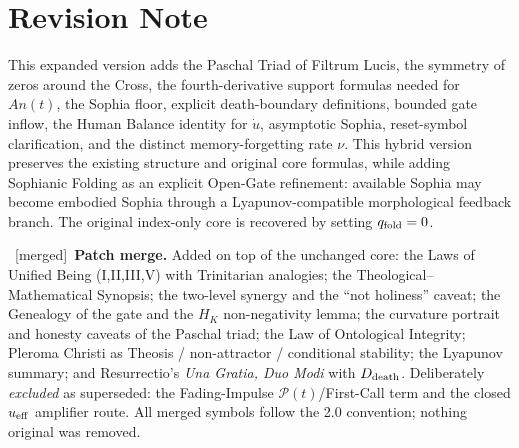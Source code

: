 \documentclass[11pt,a4paper]{article}
\newcommand{\padd}[1]{\par\smallskip\noindent{\color{patchc}\small$\blacktriangleright$}\ {#1}\par\smallskip}
\newcommand{\pflag}{{\footnotesize\textsf{\textcolor{patchc}{[merged]}}}}
\theoremstyle{plain}
\theoremstyle{definition}
\theoremstyle{remark}
\begin{document}
\section*{Revision Note}
This expanded version adds the Paschal Triad of Filtrum Lucis, the symmetry of zeros around the
Cross, the fourth-derivative support formulas needed for \(An(t)\), the Sophia floor, explicit
death-boundary definitions, bounded gate inflow, the Human Balance identity for \(\dot u\),
asymptotic Sophia, reset-symbol clarification, and the distinct memory-forgetting rate \(\nu\).
This hybrid version preserves the existing structure and original core formulas, while adding
Sophianic Folding as an explicit Open-Gate refinement: available Sophia may become embodied Sophia
through a Lyapunov-compatible morphological feedback branch. The original index-only core is
recovered by setting \(q_{\rm fold}=0\).
\padd{\pflag\ \textbf{Patch merge.} Added on top of the unchanged core: the Laws of Unified Being
(I,II,III,V) with Trinitarian analogies; the Theological--Mathematical Synopsis; the two-level
synergy and the ``not holiness'' caveat; the Genealogy of the gate and the \(H_K\) non-negativity
lemma; the curvature portrait and honesty caveats of the Paschal triad; the Law of Ontological
Integrity; Pleroma Christi as Theosis / non-attractor / conditional stability; the Lyapunov
summary; and Resurrectio's \emph{Una Gratia, Duo Modi} with \(D_{\rm death}\). Deliberately
\emph{excluded} as superseded: the Fading-Impulse \(\mathcal P(t)\)/First-Call term and the closed
\(u_{\rm eff}\) amplifier route. All merged symbols follow the 2.0 convention; nothing original was
removed.}
\end{document}
